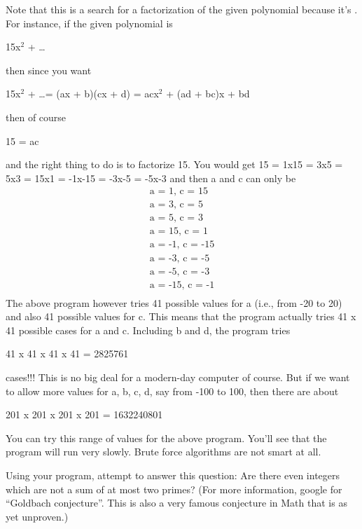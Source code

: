 Note that this is a  search for a factorization of
the given polynomial because it's .
For instance, if the given polynomial is
\begin{center}
15x$^{2}$ + \ldots
\end{center}
then since you want
\begin{center}
15x$^{2}$ + \ldots = (ax + b)(cx + d) = acx$^2$ + (ad + bc)x + bd
\end{center}
then of course
\begin{center}
15 = ac
\end{center}
and the right thing to do is to factorize 15. You would get 15 = 1x15 =
3x5 = 5x3 = 15x1 = -1x-15 = -3x-5 = -5x-3 and then a and c can only be
\begin{align*}
\text{a = 1, c = 15}\\
\text{a = 3, c = 5}\\
\text{a = 5, c = 3}\\
\text{a = 15, c = 1}\\
\text{a = -1, c = -15}\\
\text{a = -3, c = -5}\\
\text{a = -5, c = -3}\\
\text{a = -15, c = -1}\\
\end{align*}
The above program however tries 41 possible values for a (i.e., from -20
to 20) and also 41 possible values for c. This means that the program
actually tries 41 x 41 possible cases for a and c. Including b and d,
the program tries
\begin{center}
41 x 41 x 41 x 41 = 2825761
\end{center}
cases!!! This is no big deal for a modern-day computer of course. But if
we want to allow more values for a, b, c, d, say from -100 to 100, then
there are about
\begin{center}
201 x 201 x 201 x 201 = 1632240801
\end{center}
You can try this range of values for the above program.
You'll see that the program will run very slowly. Brute
force algorithms are not smart at all.

Using your program, attempt to answer this question: Are there even
integers which are not a sum of at most two primes? (For more
information, google for ``Goldbach conjecture''. This is also a very
famous conjecture in Math that is as yet unproven.)

